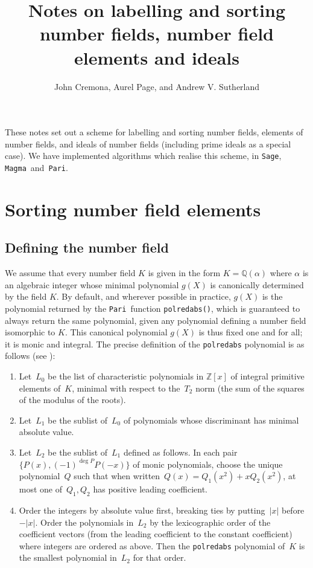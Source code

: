 \documentclass{article}
\title{Notes on labelling and sorting number fields, number field
  elements and ideals}
\author{John Cremona, Aurel Page, and Andrew V. Sutherland}
\def\Sage{{\tt Sage}}
\def\Magma{{\tt Magma}}
\def\Pari{{\tt Pari}}
\def\Z{{\mathbb Z}}
\def\Q{{\mathbb Q}}
\begin{document}
\maketitle

These notes set out a scheme for labelling and sorting number fields,
elements of number fields, and ideals of number fields (including
prime ideals as a special case).  We have implemented algorithms which
realise this scheme, in \Sage, \Magma\ and~\Pari.

\section{Sorting number field elements}
\subsection{Defining the number field}
We assume that every number field $K$ is given in the form
$K=\Q(\alpha)$ where $\alpha$ is an algebraic integer whose minimal
polynomial $g(X)$ is canonically determined by the field $K$.  By
default, and wherever possible in practice, $g(X)$ is the polynomial
returned by the \Pari\ function {\tt polredabs()}, which is guaranteed
to always return the same polynomial, given any polynomial defining a
number field isomorphic to $K$.  This canonical polynomial $g(X)$ is
thus fixed one and for all; it is monic and integral. The precise
definition of the {\tt polredabs} polynomial is as follows (see
\cite{polredabs}):

\begin{enumerate}
  \item Let~$L_0$ be the list of characteristic polynomials in $\Z[x]$
    of integral primitive elements of~$K$, minimal with respect to
    the~$T_2$ norm (the sum of the squares of the modulus of the
    roots).
  \item Let~$L_1$ be the sublist of~$L_0$ of polynomials whose discriminant has
    minimal absolute value.
  \item Let~$L_2$ be the sublist of~$L_1$ defined as follows. In each
    pair~$\{P(x), (-1)^{\deg P}P(-x)\}$ of monic polynomials, choose the unique
    polynomial~$Q$ such that when written~$Q(x) = Q_1(x^2)+xQ_2(x^2)$, at most
    one of~$Q_1,Q_2$ has positive leading coefficient.
  \item Order the integers by absolute value first, breaking ties by
    putting~$|x|$ before~$-|x|$. Order the polynomials in~$L_2$ by the
    lexicographic order of the coefficient vectors (from the leading coefficient
    to the constant coefficient) where integers are ordered as above. Then the
    {\tt polredabs} polynomial of~$K$ is the smallest polynomial in~$L_2$ for
    that order.
\end{enumerate}
\end{document}
